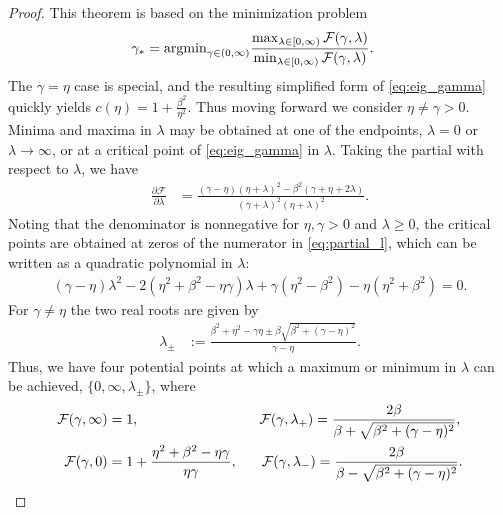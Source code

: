 \documentclass[review]{siamart}
\begin{document}
\begin{proof}
This theorem is based on the minimization problem
%
\begin{align}\label{eq:gam_opt}
\gamma_* & = \textnormal{argmin}_{\gamma \in (0,\infty)}
	\frac{\max_{\lambda\in[0,\infty)} \mathcal{F}(\gamma,\lambda)}
		{\min_{\lambda\in[0,\infty)} \mathcal{F}(\gamma,\lambda)}.
\end{align}
%
The $\gamma = \eta$ case is special, and the resulting simplified form of
\eqref{eq:eig_gamma} quickly yields $c(\eta) = 1+\tfrac{\beta^2}{\eta^2}$.
Thus moving forward we consider $\eta \neq \gamma > 0$.
Minima and maxima in $\lambda$ may be obtained at one of the endpoints,
$\lambda = 0$ or $\lambda\to\infty$, or at a critical point of \eqref{eq:eig_gamma}
in $\lambda$. Taking the partial with respect to $\lambda$, we have
%
\begin{align}\label{eq:partial_l}
\frac{\partial\mathcal{F}}{\partial\lambda} & =
	\frac{(\gamma-\eta)(\eta+\lambda)^2 - \beta^2(\gamma+\eta+2\lambda)}
		{(\gamma+\lambda)^2(\eta+\lambda)^2}.
\end{align}
%
Noting that the denominator is nonnegative for $\eta,\gamma>0$ and $\lambda \geq 0$,
the critical points are obtained at zeros of the numerator in \eqref{eq:partial_l},
which can be written as a quadratic polynomial in $\lambda$:
%
\begin{align*}
(\gamma-\eta)\lambda^2 - 2(\eta^2+\beta^2 - \eta\gamma)\lambda + 
	\gamma(\eta^2-\beta^2) - \eta(\eta^2+\beta^2) = 0.
\end{align*}
%
For $\gamma \neq \eta$ the two real roots are given by
%
\begin{align}\label{eq:roots}
\lambda_{\pm} & := \frac{\beta^2 + \eta^2 - \gamma\eta \pm
	\beta\sqrt{\beta^2 + (\gamma-\eta)^2}}{\gamma-\eta}.
\end{align}
%
Thus, we have four potential points at which a maximum or minimum in $\lambda$
can be achieved, $\{0,\infty, \lambda_\pm\}$, where
%
\begin{align}\label{eq:F_gamma}
\begin{split}
\mathcal{F}(\gamma,\infty) & = 1, \hspace{20ex}
\mathcal{F}(\gamma,\lambda_+) = \frac{2\beta}{\beta + \sqrt{\beta^2 + (\gamma-\eta)^2}}, \\
\mathcal{F}(\gamma,0) & = 1 + \frac{\eta^2+\beta^2-\eta\gamma}{\eta\gamma},
\hspace{4ex}
\mathcal{F}(\gamma,\lambda_-) = \frac{2\beta}{\beta - \sqrt{\beta^2 + (\gamma-\eta)^2}}.
\end{split}
\end{align}
%


\end{proof}
\end{document}
